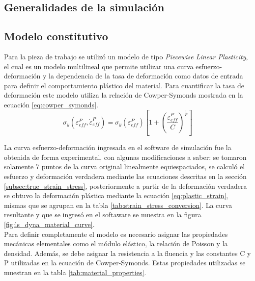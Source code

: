 \subsection{Generalidades de la simulación}



\subsection{Modelo constitutivo}

Para la pieza de trabajo se utilizó un modelo de tipo \textit{Piecewise Linear Plasticity}, 
el cual es un modelo multilineal que permite utilizar una curva esfuerzo-deformación y la 
dependencia de la tasa de deformación como datos de entrada para definir el comportamiento 
plástico del material. Para cuantificar la tasa de deformación este modelo utiliza la 
relación de Cowper-Symonds mostrada en la ecuación \ref{eq:cowper_symonds}.\\

\begin{equation} \label{eq:cowper_symonds}
\sigma_{y}\left( \varepsilon _{eff}^{P},\dot{\varepsilon }_{eff}^{P} \right) = 
{{\sigma }_{y}}\left( \varepsilon _{eff}^{P} \right)\left[ 1+{{\left( \frac{\dot{\varepsilon }_{eff}^{P}}{C} \right)}^{\frac{1}{P}}} \right]
\end{equation}

La curva esfuerzo-deformación ingresada en el software de simulación fue la obtenida 
de forma experimental, con algunas modificaciones a saber: se tomaron solamente 7 puntos 
de la curva original linealmente equiespaciados, se calculó el esfuerzo y deformación verdadera 
mediante las ecuaciones descritas en la sección \ref{subsec:true_strain_stress}, posteriormente 
a partir de la deformación verdadera se obtuvo la deformación plástica mediante la 
ecuación \ref{eq:plastic_strain}, mismas que se agrupan en la tabla \ref{tab:strain_stress_conversion}.
La curva resultante y que se ingresó en el softaware se muestra en la figura \ref{fig:ls_dyna_material_curve}. \\

Para definir completamente el modelo es necesario asignar las propiedades mecánicas elementales 
como el módulo elástico, la relación de Poisson y la densidad. Además, se debe asignar 
la resistencia a la fluencia y las constantes C y P utilizadas en la ecuación de Cowper-Symonds.
Estas propiedades utilizadas se muestran en la tabla \ref{tab:material_properties}. \\

